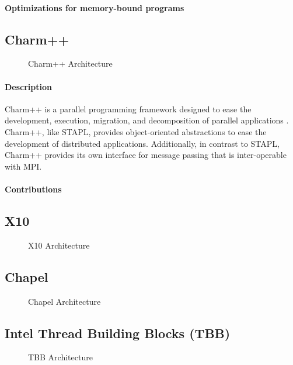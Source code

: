 \paragraph{Optimizations for memory-bound programs} 

\subsection{Charm++}
\begin{figure}[h]
    \caption{Charm++ Architecture}
    \label{fig:charm_structure}
\end{figure}
\paragraph{Description}
Charm++ is a parallel programming framework designed to ease the development, execution, migration, and decomposition of parallel applications \cite{parallel_programming_w_charm}. Charm++, like STAPL, provides object-oriented abstractions to ease the development of distributed applications. Additionally, in contrast to STAPL, Charm++ provides its own interface for message passing that is inter-operable with MPI. 

\paragraph{Contributions}



\subsection{X10}
    \begin{figure}[h]
        \caption{X10 Architecture}
        \label{fig:x10_arch}
    \end{figure}

\subsection{Chapel}
    \begin{figure}[h]
        \caption{Chapel Architecture}
        \label{fig:chapel_arch}
    \end{figure}

\subsection{Intel Thread Building Blocks (TBB)} 
    \begin{figure}[h]
        \caption{TBB Architecture}
        \label{fig:tbb_arch}
    \end{figure}
